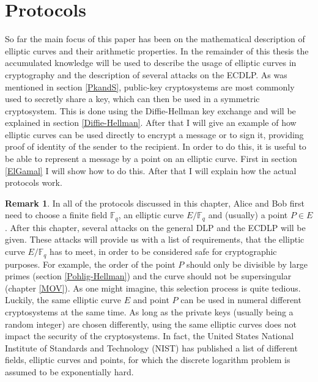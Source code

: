 \documentclass{article}
\numberwithin{equation}{section}
\theoremstyle{definition}
\newtheorem{remark}[theorem]{Remark}
\newcommand{\FF}[1]{{\mathbb F}_{#1}} %
\begin{document}
\section{Protocols}\label{protocols}
\setcounter{theorem}{0}
So far the main focus of this paper has been on the mathematical description of elliptic curves and their arithmetic properties. In the remainder of this thesis the accumulated knowledge will be used to describe the usage of elliptic curves in cryptography and the description of several attacks on the ECDLP. As was mentioned in section \ref{PkandS}, public-key cryptosystems are most commonly used to secretly share a key, which can then be used in a symmetric cryptosystem. This is done using the Diffie-Hellman key exchange and will be explained in section \ref{Diffie-Hellman}. After that I will give an example of how elliptic curves can be used directly to encrypt a message or to sign it, providing proof of identity of the sender to the recipient. In order to do this, it is useful to be able to represent a message by a point on an elliptic curve. First in section \ref{ElGamal} I will show how to do this. After that I will explain how the actual protocols work.

\begin{remark}
In all of the protocols discussed in this chapter, Alice and Bob first need to choose a finite field $\FF{q}$, an elliptic curve $E/\FF{q}$ and (usually) a point $P\in E$. After this chapter, several attacks on the general DLP and the ECDLP will be given. These attacks will provide us with a list of requirements, that the elliptic curve $E/\FF{q}$ has to meet, in order to be considered safe for cryptographic purposes. For example, the order of the point $P$ should only be divisible by large primes (section \ref{Pohlig-Hellman}) and the curve should not be supersingular (chapter \ref{MOV}). As one might imagine, this selection process is quite tedious. Luckily, the same elliptic curve $E$ and point $P$ can be used in numeral different cryptosystems at the same time. As long as the private keys (usually being a random integer) are chosen differently, using the same elliptic curves does not impact the security of the cryptosystems. In fact, the United States National Institute of Standards and Technology (NIST) has published a list \cite{DSS} of different fields, elliptic curves and points, for which the discrete logarithm problem is assumed to be exponentially hard. 
\end{remark}
\end{document}
